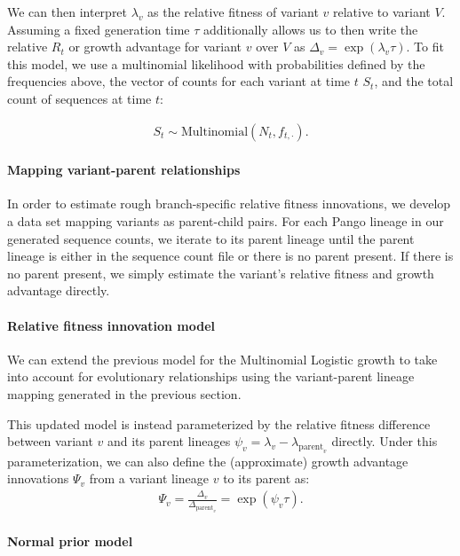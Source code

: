 We can then interpret $\lambda_{v}$ as the relative fitness of variant $v$ relative to variant $V$.
Assuming a fixed generation time $\tau$ additionally allows us to then write the relative $R_{t}$ or growth advantage for variant $v$ over $V$ as $\Delta_{v} = \exp(\lambda_{v}\tau)$.
To fit this model, we use a multinomial likelihood with probabilities defined by the frequencies above, the vector of counts for each variant at time $t$ $S_{t}$, and the total count of sequences at time $t$:

\begin{align*}
    S_{t} \sim \text{Multinomial}(N_{t}, f_{t, \cdot}).
\end{align*}

\paragraph{Mapping variant-parent relationships}%

In order to estimate rough branch-specific relative fitness innovations, we develop a data set mapping variants as parent-child pairs.
For each Pango lineage in our generated sequence counts, we iterate to its parent lineage until the parent lineage is either in the sequence count file or there is no parent present.
If there is no parent present, we simply estimate the variant's relative fitness and growth advantage directly.

\paragraph{Relative fitness innovation model}%

We can extend the previous model for the Multinomial Logistic growth to take into account for evolutionary relationships using the variant-parent lineage mapping generated in the previous section.

This updated model is instead parameterized by the relative fitness difference between variant $v$ and its parent lineages $\psi_{v} = \lambda_{v} - \lambda_{\text{parent}_{v}}$ directly.
Under this parameterization, we can also define the (approximate) growth advantage innovations $\Psi_{v}$ from a variant lineage $v$ to its parent as:
\begin{align*}
\Psi_{v} = \frac{\Delta_{v}}{\Delta_{\text{parent}_{v}}} = \exp(\psi_{v} \tau).
\end{align*}

\paragraph{Normal prior model}%


